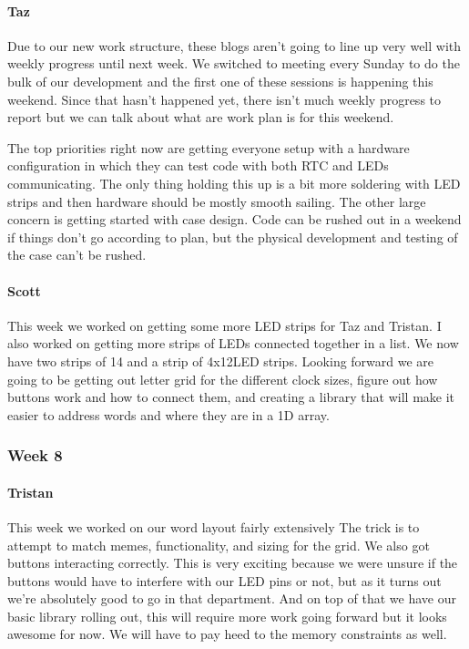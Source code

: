 \documentclass[onecolumn, draftclsnofoot,10pt, compsoc]{IEEEtran}
\begin{document}
\paragraph{Taz}
Due to our new work structure, these blogs aren't going to line up very well with weekly progress until next week. We switched to meeting every Sunday to do the bulk of our development and the first one of these sessions is happening this weekend. Since that hasn't happened yet, there isn't much weekly progress to report but we can talk about what are work plan is for this weekend.

The top priorities right now are getting everyone setup with a hardware configuration in which they can test code with both RTC and LEDs communicating. The only thing holding this up is a bit more soldering with LED strips and then hardware should be mostly smooth sailing. The other large concern is getting started with case design. Code can be rushed out in a weekend if things don't go according to plan, but the physical development and testing of the case can't be rushed.
\paragraph{Scott}
This week we worked on getting some more LED strips for Taz and Tristan. I also worked on getting more strips of LEDs connected together in a list. We now have two strips of 14 and a strip of 4x12LED strips. Looking forward we are going to be getting out letter grid for the different clock sizes, figure out how buttons work and how to connect them, and creating a library that will make it easier to address words and where they are in a 1D array.
\subsubsection{Week 8}
\paragraph{Tristan}
This week we worked on our word layout fairly extensively The trick is to attempt to match memes, functionality, and sizing for the grid. We also got buttons interacting correctly. This is very exciting because we were unsure if the buttons would have to interfere with our LED pins or not, but as it turns out we're absolutely good to go in that department. And on top of that we have our basic library rolling out, this will require more work going forward but it looks awesome for now. We will have to pay heed to the memory constraints as well.
\end{document}
